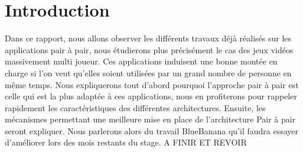 \section{Introduction}
	Dans ce rapport, nous allons observer les différents travaux déjà réalisés sur les applications pair à pair, nous étudierons plus précisément le cas des jeux vidéos massivement multi joueur. Ces applications induisent une bonne montée en charge si l'on veut qu'elles soient utilisées par un grand nombre de personne en même temps. Nous expliquerons tout d'abord pourquoi l'approche pair à pair est celle qui est la plus adaptée à ces applications, nous en profiterons pour rappeler rapidement les caractéristiques des différentes architectures. Ensuite, les mécanismes permettant une meilleure mise en place de l'architecture Pair à pair seront expliquer. Nous parlerons alors du travail BlueBanana qu'il faudra essayer d'améliorer lors des mois restants du stage. A FINIR ET REVOIR
